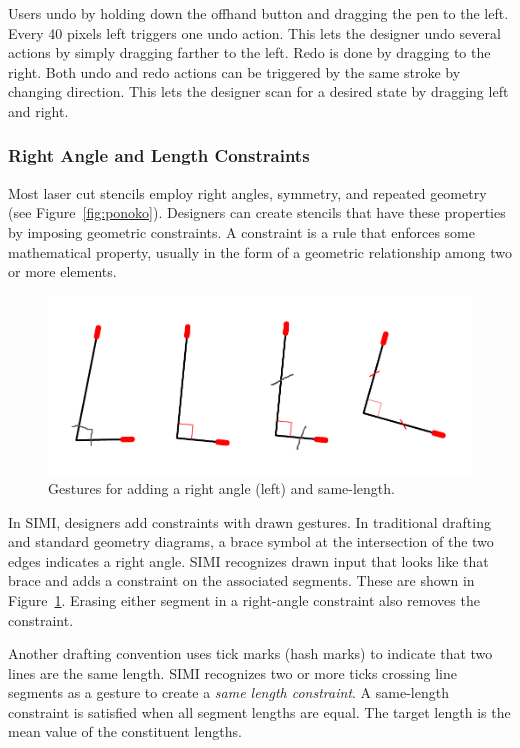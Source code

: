 \documentclass{article}
\begin{document}
Users undo by holding down the offhand button and dragging the pen to
the left. Every 40 pixels left triggers one undo action. This lets the
designer undo several actions by simply dragging farther to the
left. Redo is done by dragging to the right. Both undo and redo
actions can be triggered by the same stroke by changing
direction. This lets the designer scan for a desired state by dragging
left and right.

\subsubsection{Right Angle and Length Constraints}

Most laser cut stencils employ right angles, symmetry, and repeated
geometry (see Figure~\ref{fig:ponoko}). Designers can create stencils
that have these properties by imposing geometric constraints. A
constraint is a rule that enforces some mathematical property, usually
in the form of a geometric relationship among two or more
elements.

\begin{figure}[h]
  \centering
  \includegraphics[width=0.9\linewidth]{img/constraints-all.pdf}
  \caption{Gestures for adding a right angle (left) and same-length.}
  \label{fig:constraints}
\end{figure}

In SIMI, designers add constraints with drawn gestures. In traditional
drafting and standard geometry diagrams, a brace symbol at the
intersection of the two edges indicates a right angle. SIMI recognizes
drawn input that looks like that brace and adds a constraint on the
associated segments. These are shown in
Figure~\ref{fig:constraints}. Erasing either segment in a right-angle
constraint also removes the constraint.

Another drafting convention uses tick marks (hash marks) to indicate
that two lines are the same length. SIMI recognizes two or more ticks
crossing line segments as a gesture to create a \textit{same length
  constraint}. A same-length constraint is satisfied when all segment
lengths are equal. The target length is the mean value of the
constituent lengths.
\end{document}
